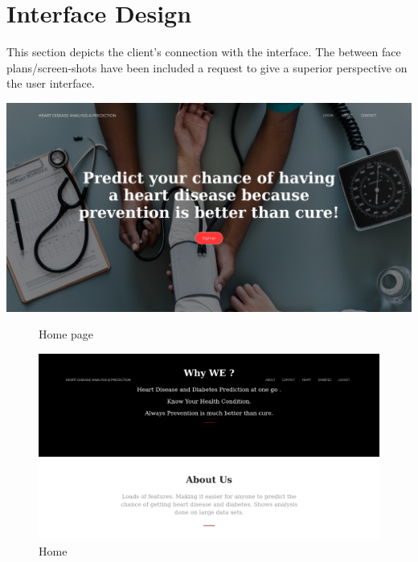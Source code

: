 \documentclass[oneside,12pt]{Classes/VTU}
\begin{document}
    	\section{Interface Design}
    	This section depicts the client's connection with the interface. The between face plans/screen-shots have been included a request to give a superior perspective on the user interface.
    	
    	
    		\begin{center}
    			\includegraphics[width=17cm]{Screenshots/home1.jpg}
    			\begin{figure}
    				\caption{Home page }
    			\end{figure}
    		\end{center}
    		
    		\begin{figure}
    				\begin{center}
    				\includegraphics[width=17cm]{Screenshots/home2.PNG}
    				\caption{Home}
    				\end{center}
    		\end{figure}
    		
\end{document}
